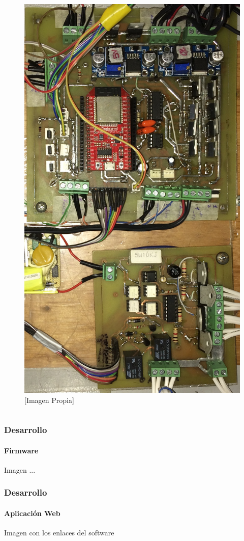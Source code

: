 \begin{frame}
\begin{columns}
\begin{figure}
	\caption{[Imagen Propia]}
	\label{fig:prot}
	\includegraphics[width=\linewidth]{Imagenes/Tarjeta.jpg}
\end{figure}

\end{columns}
\end{frame}

\begin{frame}
\frametitle{Desarrollo}
\framesubtitle{Firmware}

Imagen ...

\end{frame}

\begin{frame}
\frametitle{Desarrollo}
\framesubtitle{Aplicación Web}

Imagen con los enlaces del software

\end{frame}